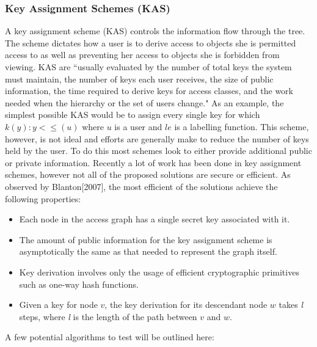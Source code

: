\documentclass[10pt, titlepage]{article}
\begin{document}
\subsubsection{Key Assignment Schemes (KAS)}
A key assignment scheme (KAS) controls the information flow through the tree. The scheme dictates how a user is to derive access to objects she is permitted access to as well as preventing her access to objects she is forbidden from viewing. KAS are ``usually evaluated by the number of total keys the system must maintain, the number of keys each user receives, the size of public information, the time required to derive keys for access classes, and the work needed when the hierarchy or the set of users change.\cite{atallah2005}" As an example, the simplest possible KAS would be to assign every single key for which $k(y) : y<\le(u)$ where $u$ is a user and $le$ is a labelling function. This scheme, however, is not ideal and efforts are generally make to reduce the number of keys held by the user. To do this most schemes look to either provide additional public or private information. 
\newline \indent Recently a lot of work has been done in key assignment schemes, however not all of the proposed solutions are secure or efficient. As observed by Blanton[2007], the most efficient of the solutions achieve the following properties\cite{blanton2007}:
\begin{itemize}
\item Each node in the access graph has a single secret key associated with it.
\item The amount of public information for the key assignment scheme is asymptotically the same as that needed to represent the graph itself.
\item Key derivation involves only the usage of efficient cryptographic primitives such
as one-way hash functions.
\item Given a key for node $v$, the key derivation for its descendant node $w$ takes \textit{l} steps, where \textit{l} is the length of the path between $v$ and $w$.
\end{itemize}
 A few potential algorithms to test will be outlined here:
\end{document}
